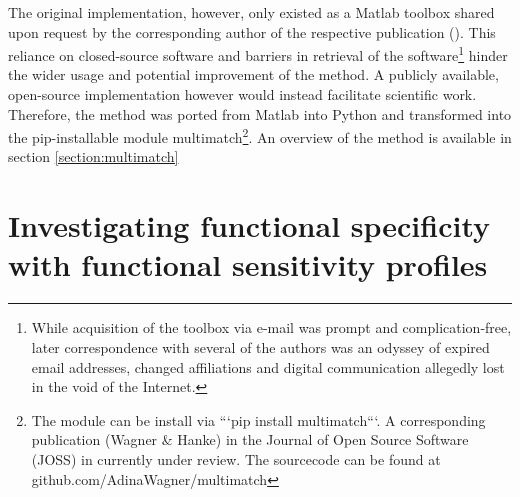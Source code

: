 \documentclass[a4paper, 12pt]{scrreprt}
\begin{document}
The original implementation, however, only existed as a Matlab toolbox shared upon request by the corresponding author of the respective publication (\cite{dewhurst2012depends}). This reliance on closed-source software and barriers in retrieval of the software\footnote{While acquisition of the toolbox via e-mail was prompt and complication-free, later correspondence with several of the authors was an odyssey of expired email addresses, changed affiliations and digital communication allegedly lost in the void of the Internet.} hinder the wider usage and potential improvement of the method. A publicly available, open-source implementation however would instead facilitate scientific work. Therefore, the method was ported from Matlab into Python and transformed into the pip-installable module multimatch\footnote{The module can be install via ```pip install multimatch```. A corresponding publication (Wagner \& Hanke) in the Journal of Open Source Software (JOSS) in currently under review. The sourcecode can be found at github.com/AdinaWagner/multimatch}. An overview of the method is available in section \ref{section:multimatch}

\section{Investigating functional specificity with functional sensitivity profiles}\label{section:methodintroduction}
\end{document}
